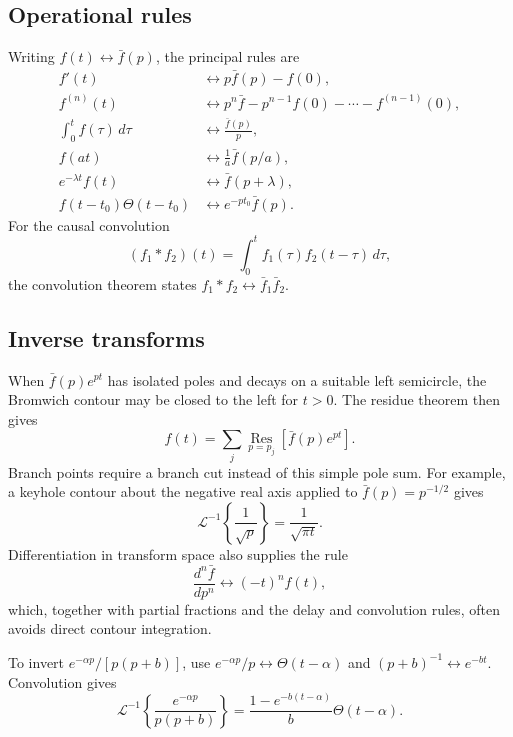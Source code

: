 \subsection{Operational rules}

Writing $f(t)\longleftrightarrow\bar f(p)$, the principal rules are
\begin{align}
f'(t)&\longleftrightarrow p\bar f(p)-f(0),\\
f^{(n)}(t)&\longleftrightarrow p^n\bar f-p^{n-1}f(0)-\cdots-f^{(n-1)}(0),\\
\int_0^tf(\tau)\,d\tau&\longleftrightarrow\frac{\bar f(p)}{p},\\
f(at)&\longleftrightarrow\frac{1}{a}\bar f(p/a),\\
e^{-\lambda t}f(t)&\longleftrightarrow\bar f(p+\lambda),\\
f(t-t_0)\Theta(t-t_0)&\longleftrightarrow e^{-pt_0}\bar f(p).
\end{align}
For the causal convolution
\begin{equation}
(f_1*f_2)(t)=\int_0^tf_1(\tau)f_2(t-\tau)\,d\tau,
\end{equation}
the convolution theorem states $f_1*f_2\longleftrightarrow\bar f_1\bar f_2$.

\subsection{Inverse transforms}

When $\bar f(p)e^{pt}$ has isolated poles and decays on a suitable left semicircle, the Bromwich contour may be closed to the left for $t>0$. The residue theorem then gives
\begin{equation}
f(t)=\sum_j\operatorname*{Res}_{p=p_j}\left[\bar f(p)e^{pt}\right].
\end{equation}
Branch points require a branch cut instead of this simple pole sum. For example, a keyhole contour about the negative real axis applied to $\bar f(p)=p^{-1/2}$ gives
\begin{equation}
\mathcal{L}^{-1}\left\{\frac{1}{\sqrt p}\right\}=\frac{1}{\sqrt{\pi t}}.
\end{equation}
Differentiation in transform space also supplies the rule
\begin{equation}
\frac{d^n\bar f}{dp^n}\longleftrightarrow(-t)^nf(t),
\end{equation}
which, together with partial fractions and the delay and convolution rules, often avoids direct contour integration.

\begin{example}
To invert $e^{-\alpha p}/[p(p+b)]$, use $e^{-\alpha p}/p\longleftrightarrow\Theta(t-\alpha)$ and $(p+b)^{-1}\longleftrightarrow e^{-bt}$. Convolution gives
\begin{equation}
\mathcal{L}^{-1}\left\{\frac{e^{-\alpha p}}{p(p+b)}\right\}
=\frac{1-e^{-b(t-\alpha)}}{b}\Theta(t-\alpha).
\end{equation}
\end{example}